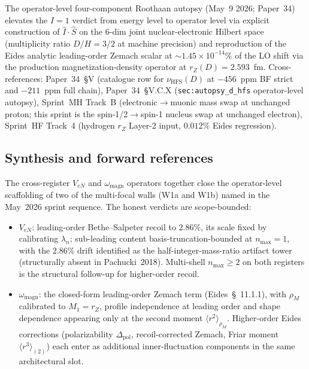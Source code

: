 \documentclass[twocolumn,prc,amsmath,amssymb,superscriptaddress]{revtex4-2}
\begin{document}
The operator-level four-component Roothaan autopsy
(May~9 2026; Paper~34) elevates the $I=1$ verdict from energy level to operator level via
explicit construction of $\hat{I}\cdot\hat{S}$ on the 6-dim joint
nuclear-electronic Hilbert space (multiplicity ratio
$D/H = 3/2$ at machine precision) and reproduction of the Eides analytic
leading-order Zemach scalar at $\sim 1.45 \times 10^{-14}\%$ of the
LO shift via the production magnetization-density operator at
$r_Z(D) = 2.593$~fm.
Cross-references: Paper~34~\S V (catalogue row for $\nu_\text{HFS}(D)$
at $-456$~ppm BF strict and $-211$~ppm full chain), Paper~34~\S V.C.X
(\texttt{sec:autopsy\_d\_hfs} operator-level autopsy),
Sprint~MH Track~B (electronic$\to$muonic mass swap at unchanged
proton; this sprint is the spin-1/2$\to$spin-1 nucleus swap at
unchanged electron), Sprint~HF Track~4 (hydrogen $r_Z$ Layer-2 input,
$0.012\%$ Eides regression).

\subsection{Synthesis and forward references}
\label{ssec:cross-synthesis}

The cross-register $V_{eN}$ and $\omega_{\mathrm{magn}}$ operators
together close the operator-level scaffolding of two of the multi-focal
walls (W1a and W1b) named in the May~2026 sprint sequence. The honest
verdicts are scope-bounded:
\begin{itemize}
  \item $V_{eN}$: leading-order Bethe--Salpeter recoil to $2.86\%$, its
    scale fixed by calibrating $\lambda_n$; sub-leading content basis-truncation-bounded
    at $n_{\max} = 1$, with the $2.86\%$ drift identified as the
    half-integer-mass-ratio artifact tower (structurally absent in
    Pachucki~2018). Multi-shell $n_{\max} \geq 2$ on both registers is
    the structural follow-up for higher-order recoil.
  \item $\omega_{\mathrm{magn}}$: the closed-form leading-order
    Zemach term (Eides~\S~11.1.1), with $\rho_M$ calibrated to $M_1 = r_Z$, profile independence at leading order
    and shape dependence appearing only at the second moment
    $\langle r^2\rangle_{\rho_M}$. Higher-order Eides corrections
    (polarizability $\Delta_{\mathrm{pol}}$, recoil-corrected Zemach,
    Friar moment $\langle r^3\rangle_{(2)}$) each enter as additional
    inner-fluctuation components in the same architectural slot.
\end{itemize}
\end{document}

